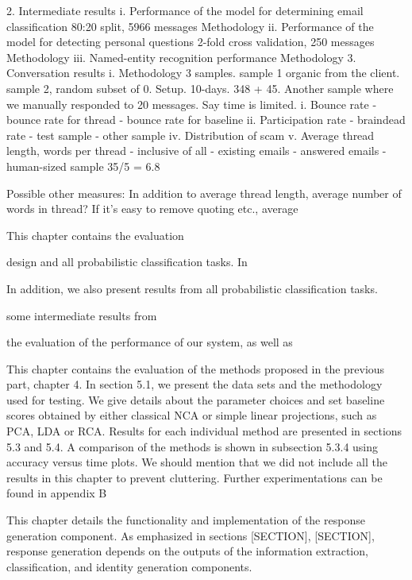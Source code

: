 	2. Intermediate results
		i. Performance of the model for determining email classification
			80:20 split, 5966 messages
			Methodology
		ii. Performance of the model for detecting personal questions
			2-fold cross validation, 250 messages
			Methodology
		iii. Named-entity recognition performance
			Methodology
	3. Conversation results
		i. Methodology 3 samples. sample 1 organic from the client. sample 2, random subset of 
		0. Setup. 10-days. 348 + 45. Another sample where we manually responded to 20 messages. Say time is limited.
		i. Bounce rate
			- bounce rate for thread
			- bounce rate for baseline
		ii. Participation rate
			- braindead rate
			- test sample
			- other sample
		iv. Distribution of scam
		v.  Average thread length, words per thread
			- inclusive of all
			- existing emails
			- answered emails
			- human-sized sample 35/5 = 6.8


Possible other measures: In addition to average thread length, average number of words in thread? If it's easy to remove quoting etc., average %






This chapter contains the evaluation 



design and all probabilistic classification tasks. In 

In addition, we also present results from all probabilistic classification tasks.

some intermediate results from 

the evaluation of the performance of our system, as well as 


This chapter contains the evaluation of the methods proposed in the previous
part, chapter 4. In section 5.1, we present the data sets and the methodology
used for testing. We give details about the parameter choices and set baseline
scores obtained by either classical NCA or simple linear projections, such as PCA,
LDA or RCA. Results for each individual method are presented in sections 5.3
and 5.4. A comparison of the methods is shown in subsection 5.3.4 using accuracy
versus time plots.
We should mention that we did not include all the results in this chapter to
prevent cluttering. Further experimentations can be found in appendix B

This chapter details the functionality and implementation of the response generation component. As emphasized in sections [SECTION], [SECTION], response generation depends on the outputs of the information extraction, classification, and identity generation components. 

